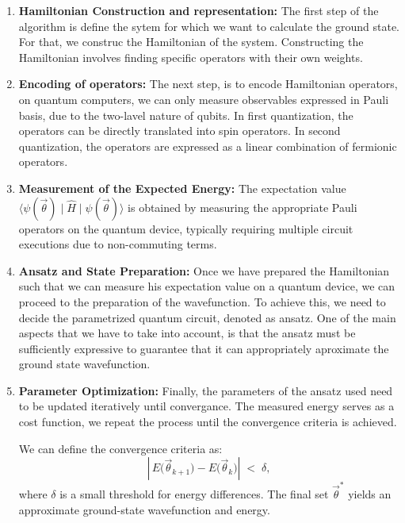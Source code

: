\begin{enumerate}
    \item \textbf{Hamiltonian Construction and representation:} 
    The first step of the algorithm is define the sytem for which we want to calculate the ground state. For that, we construc the Hamiltonian of the system. Constructing the Hamiltonian involves finding specific operators with their own weights.
    
    \item \textbf{Encoding of operators:}
    The next step, is to encode Hamiltonian operators, on quantum computers, we can only measure observables expressed in Pauli basis, due to the two-lavel nature of qubits. In first quantization, the operators can be directly translated into spin operators. In second quantization, the operators are expressed as a linear combination of fermionic operators.

    \item \textbf{Measurement of the Expected Energy:}
    The expectation value 
    \(\langle \psi(\vec{\theta}) \mid \hat{H} \mid \psi(\vec{\theta}) \rangle\)
    is obtained by measuring the appropriate Pauli operators on the quantum device, typically requiring multiple circuit executions due to non-commuting terms.

    \item \textbf{Ansatz and State Preparation:}
    Once we have prepared the Hamiltonian such that we can measure his expectation value on a quantum device, we can proceed to the preparation of the wavefunction. To achieve this, we need to decide the parametrized quantum circuit, denoted as ansatz. One of the main aspects that we have to take into account, is that the ansatz must be sufficiently expressive to guarantee that it can appropriately aproximate the ground state wavefunction.

    \item \textbf{Parameter Optimization:}
    Finally, the parameters of the ansatz used need to be updated iteratively until convergance. The measured energy serves as a cost function, we repeat the process until the convergence criteria is achieved.

    We can define the convergence criteria as:
    \[
    \left|\,E\bigl(\vec{\theta}_{k+1}\bigr) - E\bigl(\vec{\theta}_{k}\bigr)\right|
    \;<\;\delta,
    \]
    where \(\delta\) is a small threshold for energy differences. The final set \(\vec{\theta}^{*}\) yields an approximate ground-state wavefunction and energy.
\end{enumerate}

